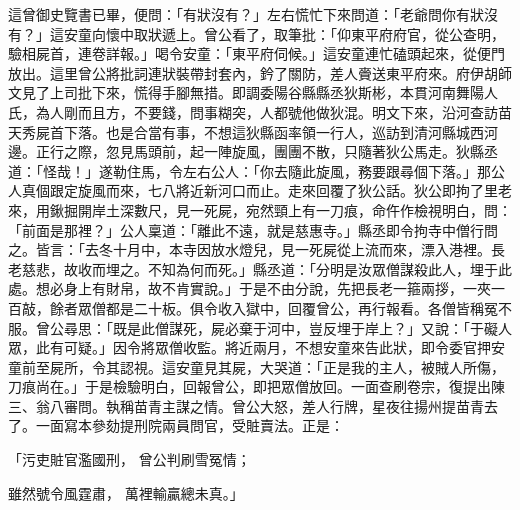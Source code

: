 \begin{showcontents}{}
這曾御史覽書已畢，便問：「有狀沒有？」左右慌忙下來問道：「老爺問你有狀沒有？」這安童向懷中取狀遞上。曾公看了，取筆批：「仰東平府府官，從公查明，驗相屍首，連卷詳報。」喝令安童：「東平府伺候。」這安童連忙磕頭起來，從便門放出。這里曾公將批詞連狀裝帶封套內，鈐了關防，差人賫送東平府來。府伊胡師文見了上司批下來，慌得手腳無措。即調委陽谷縣縣丞狄斯彬，本貫河南舞陽人氏，為人剛而且方，不要錢，問事糊突，人都號他做狄混。明文下來，沿河查訪苗天秀屍首下落。也是合當有事，不想這狄縣函率領一行人，巡訪到清河縣城西河邊。正行之際，忽見馬頭前，起一陣旋風，團團不散，只隨著狄公馬走。狄縣丞道：「怪哉！」遂勒住馬，令左右公人：「你去隨此旋風，務要跟尋個下落。」那公人真個跟定旋風而來，七八將近新河口而止。走來回覆了狄公話。狄公即拘了里老來，用鍬掘開岸土深數尺，見一死屍，宛然頸上有一刀痕，命仵作檢視明白，問：「前面是那裡？」公人稟道：「離此不遠，就是慈惠寺。」縣丞即令拘寺中僧行問之。皆言：「去冬十月中，本寺因放水燈兒，見一死屍從上流而來，漂入港裡。長老慈悲，故收而埋之。不知為何而死。」縣丞道：「分明是汝眾僧謀殺此人，埋于此處。想必身上有財帛，故不肯實說。」于是不由分說，先把長老一箍兩拶，一夾一百敲，餘者眾僧都是二十板。俱令收入獄中，回覆曾公，再行報看。各僧皆稱冤不服。曾公尋思：「既是此僧謀死，屍必棄于河中，豈反埋于岸上？」又說：「于礙人眾，此有可疑。」因令將眾僧收監。將近兩月，不想安童來告此狀，即令委官押安童前至屍所，令其認視。這安童見其屍，大哭道：「正是我的主人，被賊人所傷，刀痕尚在。」于是檢驗明白，回報曾公，即把眾僧放回。一面查刷卷宗，復提出陳三、翁八審問。執稱苗青主謀之情。曾公大怒，差人行牌，星夜往揚州提苗青去了。一面寫本參劾提刑院兩員問官，受賍賣法。正是：

「污吏賍官濫國刑，  曾公判刷雪冤情；

雖然號令風霆肅，  萬裡輸贏總未真。」


\end{showcontents}
